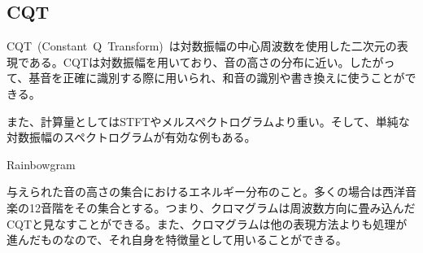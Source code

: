 \clearpage

\subsection{CQT}

CQT~(Constant~Q~Transform)~は対数振幅の中心周波数を使用した二次元の表現である。CQTは対数振幅を用いており、音の高さの分布に近い。したがって、基音を正確に識別する際に用いられ、和音の識別や書き換えに使うことができる。

また、計算量としてはSTFTやメルスペクトログラムより重い。そして、単純な対数振幅のスペクトログラムが有効な例もある。

Rainbowgram

与えられた音の高さの集合におけるエネルギー分布のこと。多くの場合は西洋音楽の12音階をその集合とする。つまり、クロマグラムは周波数方向に畳み込んだCQTと見なすことができる。また、クロマグラムは他の表現方法よりも処理が進んだものなので、それ自身を特徴量として用いることができる。

